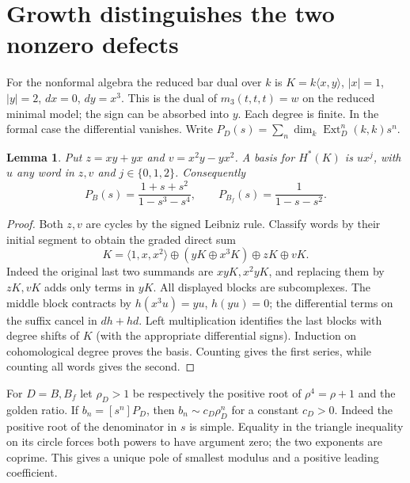 \documentclass[11pt]{article}
\newtheorem{lem}[thm]{Lemma}
\newcommand{\Ext}{\operatorname{Ext}}
\begin{document}
\section{Growth distinguishes the two nonzero defects}
For the nonformal algebra the reduced bar dual over $k$ is
$K=k\langle x,y\rangle$, $|x|=1$, $|y|=2$, $dx=0$, $dy=x^3$.
This is the dual of $m_3(t,t,t)=w$ on the reduced minimal model;
the sign can be absorbed into $y$. Each degree is finite. In the formal
case the differential vanishes. Write $P_D(s)=\sum_n\dim_k\Ext_D^n(k,k)s^n$.

\begin{lem}\label{series}
Put $z=xy+yx$ and $v=x^2y-yx^2$. A basis for $H^*(K)$ is
$u x^j$, with $u$ any word in $z,v$ and $j\in\{0,1,2\}$. Consequently
\[
 P_B(s)=\frac{1+s+s^2}{1-s^3-s^4},\qquad
 P_{B_f}(s)=\frac{1}{1-s-s^2}.
\]
\end{lem}
\begin{proof}
Both $z,v$ are cycles by the signed Leibniz rule. Classify words by
their initial segment to obtain the graded direct sum
\[
 K=\langle 1,x,x^2\rangle\oplus (yK\oplus x^3K)\oplus zK\oplus vK .
\]
Indeed the original last two summands are $xyK,x^2yK$, and replacing
them by $zK,vK$ adds only terms in $yK$. All displayed blocks are
subcomplexes. The middle block contracts by $h(x^3u)=yu$, $h(yu)=0$;
the differential terms on the suffix cancel in $dh+hd$. Left multiplication
identifies the last blocks with degree shifts of $K$ (with the appropriate
differential signs). Induction on cohomological degree proves the basis.
Counting gives the first series, while counting all words gives the second.
\end{proof}

For $D=B,B_f$ let $\rho_D>1$ be respectively the positive root of
$\rho^4=\rho+1$ and the golden ratio. If $b_n=[s^n]P_D$, then
$b_n\sim c_D\rho_D^n$ for a constant $c_D>0$. Indeed the positive
root of the denominator in $s$ is simple. Equality in the triangle
inequality on its circle forces both powers to have argument zero;
the two exponents are coprime. This gives a unique pole of smallest
modulus and a positive leading coefficient.
\end{document}
